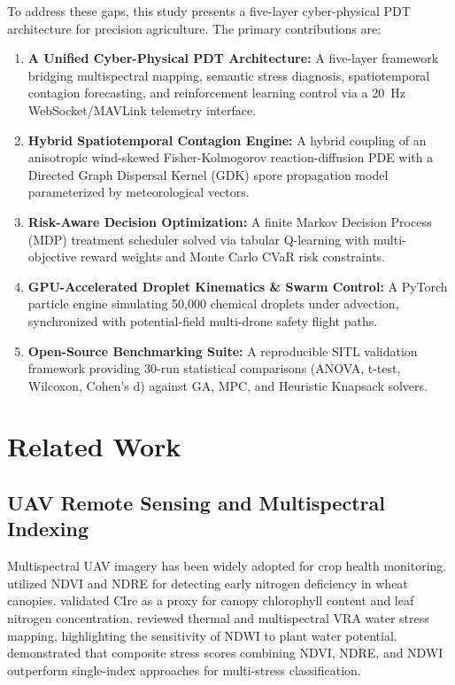 \documentclass[review,3p,times,authoryear]{elsarticle}
\begin{document}
To address these gaps, this study presents a five-layer cyber-physical PDT architecture for precision agriculture. The primary contributions are:
\begin{enumerate}
    \item \textbf{A Unified Cyber-Physical PDT Architecture:} A five-layer framework bridging multispectral mapping, semantic stress diagnosis, spatiotemporal contagion forecasting, and reinforcement learning control via a 20~Hz WebSocket/MAVLink telemetry interface.
    \item \textbf{Hybrid Spatiotemporal Contagion Engine:} A hybrid coupling of an anisotropic wind-skewed Fisher-Kolmogorov reaction-diffusion PDE with a Directed Graph Dispersal Kernel (GDK) spore propagation model parameterized by meteorological vectors.
    \item \textbf{Risk-Aware Decision Optimization:} A finite Markov Decision Process (MDP) treatment scheduler solved via tabular Q-learning with multi-objective reward weights and Monte Carlo CVaR risk constraints.
    \item \textbf{GPU-Accelerated Droplet Kinematics \& Swarm Control:} A PyTorch particle engine simulating 50,000 chemical droplets under advection, synchronized with potential-field multi-drone safety flight paths.
    \item \textbf{Open-Source Benchmarking Suite:} A reproducible SITL validation framework providing 30-run statistical comparisons (ANOVA, t-test, Wilcoxon, Cohen's d) against GA, MPC, and Heuristic Knapsack solvers.
\end{enumerate}

\section{Related Work}

\subsection{UAV Remote Sensing and Multispectral Indexing}
Multispectral UAV imagery has been widely adopted for crop health monitoring. \citet{zheng2018} utilized NDVI and NDRE for detecting early nitrogen deficiency in wheat canopies. \citet{bonfil2004} validated CIre as a proxy for canopy chlorophyll content and leaf nitrogen concentration. \citet{maes2019perspectives} reviewed thermal and multispectral VRA water stress mapping, highlighting the sensitivity of NDWI to plant water potential. \citet{weiss2020remote} demonstrated that composite stress scores combining NDVI, NDRE, and NDWI outperform single-index approaches for multi-stress classification.
\end{document}

